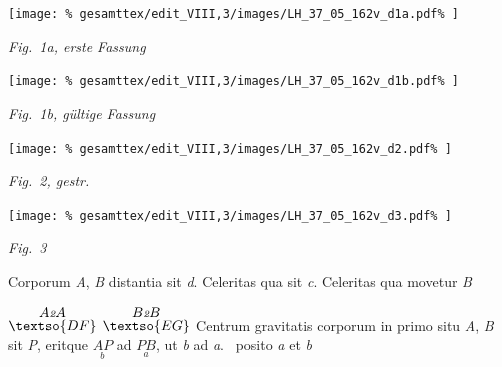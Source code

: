 \centerline{%
\texttt{[image: \%
gesamttex/edit\_VIII,3/images/LH\_37\_05\_162v\_d1a.pdf\%
]}} 
\vspace{0.5em}
\centerline{%
\lbrack\textit{Fig.~1a, erste Fassung}\rbrack%
}
%
\vspace{1.5em} %
\centerline{%
\texttt{[image: \%
gesamttex/edit\_VIII,3/images/LH\_37\_05\_162v\_d1b.pdf\%
]}} 
\vspace{0.5em}
\centerline{%
\lbrack\textit{Fig.~1b, gültige Fassung}\rbrack%
}
%
\vspace{1.5em} %
\centerline{%
\texttt{[image: \%
gesamttex/edit\_VIII,3/images/LH\_37\_05\_162v\_d2.pdf\%
]}} 
\vspace{0.5em}
\centerline{%
\lbrack\textit{Fig.~2, gestr.}\rbrack%
}
\newpage%
%
\centerline{%
\texttt{[image: \%
gesamttex/edit\_VIII,3/images/LH\_37\_05\_162v\_d3.pdf\%
]}} 
\vspace{0.5em}
\centerline{%
\lbrack\textit{Fig.~3}\rbrack%
}
\vspace{1.5em}
%
\pstart 
\noindent
Corporum \textit{A}, \textit{B} distantia 
%
sit \textit{d}. %
Celeritas\protect{} qua 
%
%
sit \textit{c}. Celeritas qua movetur \textit{B}
%
\rule[0cm]{0mm}{12pt}%
%
$\overset%
{\displaystyle A{\scriptstyle \textit{2}}A}{%
{\textso{DF}}}$
$\overset%
{\displaystyle B{\scriptstyle \textit{2}}B}{%
{\textso{EG}}}$
%
Centrum gravitatis%
\protect{} corporum in primo situ \textit{A}, \textit{B} sit \textit{P}, 
%
eritque $\underset{\displaystyle b}{AP}$ ad $ \underset{\displaystyle a}{PB}$, ut \textit{b} ad \textit{a}.\
%
posito \textit{a} et \textit{b} 

